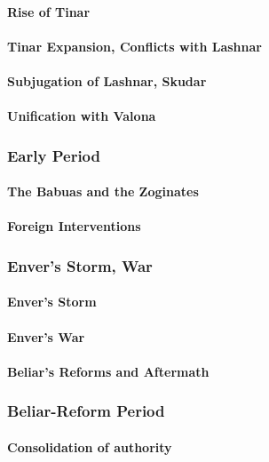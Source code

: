 		\paragraph{Rise of Tinar}
			
		\paragraph{Tinar Expansion, Conflicts with Lashnar}
		\paragraph{Subjugation of Lashnar, Skudar}
		\paragraph{Unification with Valona}
	\subsubsection{Early Period}
		\paragraph{The Babuas and the Zoginates}
		\paragraph{Foreign Interventions}
	\subsubsection{Enver's Storm, War}
		\paragraph{Enver's Storm}
		\paragraph{Enver's War}
		\paragraph{Beliar's Reforms and Aftermath}
	\subsubsection{Beliar-Reform Period}
		\paragraph{Consolidation of authority}
